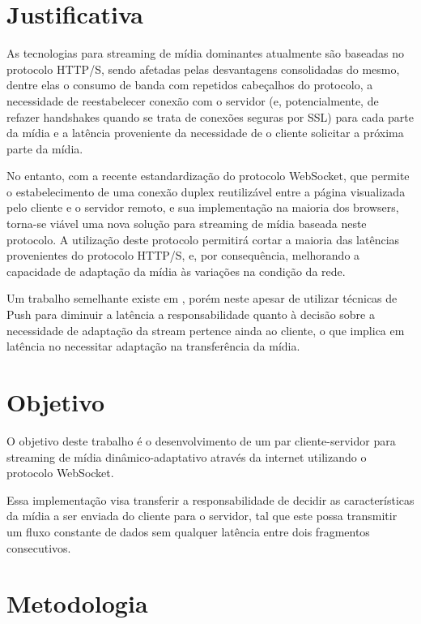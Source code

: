 \documentclass[a4paper,12pt]{article}
\begin{document}
\section{Justificativa}

As tecnologias para streaming de mídia dominantes atualmente são baseadas no protocolo HTTP/S, sendo afetadas pelas desvantagens consolidadas do mesmo, dentre elas o consumo de banda com repetidos cabeçalhos do protocolo, a necessidade de reestabelecer conexão com o servidor (e, potencialmente, de refazer handshakes quando se trata de conexões seguras por SSL) para cada parte 
da mídia e a latência proveniente da necessidade de o cliente solicitar a próxima parte da mídia.

No entanto, com a recente estandardização do protocolo WebSocket, que permite o estabelecimento de uma conexão duplex reutilizável entre a página visualizada pelo cliente e o servidor remoto, e sua implementação na maioria dos browsers, torna-se viável uma nova solução para streaming de mídia baseada neste protocolo. A utilização deste protocolo permitirá cortar a maioria das latências provenientes do protocolo HTTP/S, e, por consequência, melhorando a capacidade de adaptação da mídia às variações na condição da rede.

Um trabalho semelhante existe em \cite{Wu:2018}, porém neste apesar de utilizar técnicas de Push para diminuir a latência a responsabilidade quanto à decisão sobre a necessidade de adaptação da stream pertence ainda ao cliente, o que implica em latência no necessitar adaptação na transferência da mídia.


\section{Objetivo}

O objetivo deste trabalho é o desenvolvimento de um par cliente-servidor para streaming de mídia dinâmico-adaptativo através da internet utilizando o protocolo WebSocket. 

Essa implementação visa transferir a responsabilidade de decidir as características da mídia a ser enviada do cliente para o servidor, tal que este possa transmitir um fluxo constante de dados sem qualquer latência entre dois 
fragmentos consecutivos.

\section{Metodologia}
\end{document}
